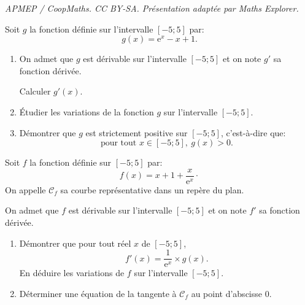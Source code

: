 \documentclass[10pt]{article}
\providecommand{\e}{{\mathrm{e}}}
\providecommand{\interval}[2]{{[#1;#2]}}
\begin{document}
\noindent\textit{APMEP / CoopMaths. CC BY-SA. Présentation adaptée par Maths Explorer.}\par\medskip
\medskip
Soit $g$ la fonction définie sur l'intervalle $\interval{-5}{5}$ par:
\[
g(x)=\e^x-x+1.
\]
\begin{enumerate}
\item On admet que $g$ est dérivable sur l'intervalle $\interval{-5}{5}$ et on note $g'$ sa fonction dérivée.

Calculer $g'(x)$.

\item Étudier les variations de la fonction $g$ sur l'intervalle $\interval{-5}{5}$.
\item Démontrer que $g$ est strictement positive sur $\interval{-5}{5}$, c'est-à-dire que:
\[
\text{pour tout }x\in\interval{-5}{5},\ g(x)>0.
\]
\end{enumerate}
Soit $f$ la fonction définie sur $\interval{-5}{5}$ par:
\[
f(x)=x +1+\frac{x}{\e^x}\cdotp
\]
On appelle $\mathcal{C}_f$ sa courbe représentative dans un repère du plan.

On admet que $f$ est dérivable sur l'intervalle $\interval{-5}{5}$ et on note $f'$ sa fonction dérivée.
\begin{enumerate}[resume]
\item Démontrer que pour tout réel $x$ de $\interval{-5}{5}$,
\[
f'(x)=\frac{1}{\e^x}\times g(x).
\]
En déduire les variations de $f$ sur l'intervalle $\interval{-5}{5}$.
\item Déterminer une équation de la tangente à $\mathcal{C}_f$ au point d'abscisse 0.
\end{enumerate}
\end{document}
